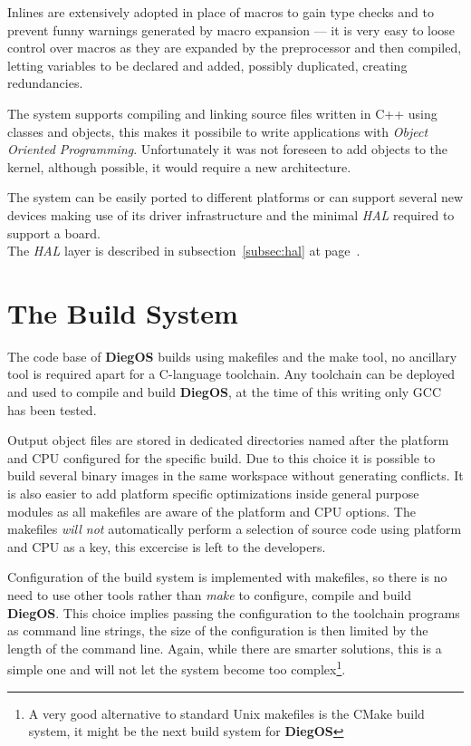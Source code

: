 \documentclass[11pt,b5paper]{scrbook}
\newcommand{\myOS}{{\color{SteelBlue}\textbf{DiegOS}}}
\begin{document}
Inlines are extensively adopted in place of macros to gain type checks and 
to prevent funny warnings generated by macro expansion --- it is very easy to loose control
over macros as they are expanded by the preprocessor and then compiled, letting variables
to be declared and added, possibly duplicated, creating redundancies.

The system supports compiling and linking source files written in C++ using
classes and objects, this makes it possibile to write applications with
\textit{Object Oriented Programming}. Unfortunately it was not foreseen to add objects to
the kernel, although possible, it would require a new architecture.

The system can be easily ported to different platforms or can support several
new devices making use of its driver infrastructure and the minimal
\textit{HAL} required to support a board.\\
The \textit{HAL} layer is described in subsection~\ref{subsec:hal} at
page~\pageref{subsec:hal}.

\section{The Build System}
The code base of {\myOS} builds using makefiles and the make tool, no ancillary
tool is required apart for a C-language toolchain.
Any toolchain can be deployed and used to compile and build {\myOS},
at the time of this writing only GCC has been tested.

Output object files are stored in dedicated directories named after the platform 
and CPU configured for the specific build.
Due to this choice it is possible to build several binary images in the same workspace without generating
conflicts.
It is also easier to add platform specific optimizations inside general purpose modules as all makefiles
are aware of the platform and CPU options.
The makefiles \textit{will not} automatically perform a selection of source
code using platform and CPU as a key, this excercise is left to the
developers.

Configuration of the build system is implemented with makefiles, so
there is no need to use other tools rather than \textit{make}
to configure, compile and build {\myOS}.
This choice implies passing the configuration to the toolchain programs as
command line strings, the size of the configuration is then limited by
the length of the command line.
Again, while there are smarter solutions, this is a simple one and will not let the
system become too complex\footnote{A very good alternative to standard Unix makefiles
is the CMake build system, it might be the next build system for {\myOS}}.
\end{document}
